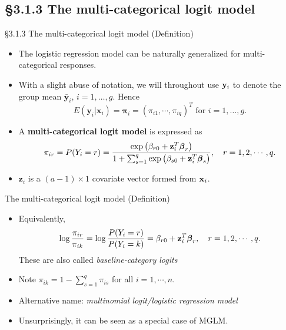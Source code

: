 \documentclass{beamer}
\newcommand{\boldpi}{{\boldsymbol \pi}}
\newcommand{\currentsubsection}{}
\let\oldsubsection\subsection
\renewcommand{\subsection}[1]{\oldsubsection{#1}\renewcommand{\currentsubsection}{#1}}
\newenvironment{wideitemize}%
  {\begin{itemize}%
    \setlength{\parskip}{1em}}%
  {\end{itemize}}
\begin{document}
\subsection{\S3.1.3 The multi-categorical logit model}\label{sec:3.1.3}
\begin{frame}{\S3.1.3 The multi-categorical logit model (Definition) }
\begin{wideitemize}
\item The logistic regression model can be naturally generalized for multi-categorical responses.

\item  With a slight abuse of notation,  we will throughout use 
${\bf y}_i$ to denote the group mean $\bar{\textbf{y}}_i$, $i = 1, \dots, g$. Hence
\[
E(\textbf{y}_i|\textbf{x}_i) = \boldpi_i = (\pi_{i1},\cdots, \pi_{iq})^T \text{ for } i =1, \dots, g
.
\]


\item A \textbf{multi-categorical logit model} is expressed as
\[
\pi_{ir}=P(Y_i=r)=\frac{\exp\left(\beta_{r0}+\textbf{z}_i^T\mbox{\boldmath $\beta$}_r\right)}{1+
\sum_{s=1}^q \exp\left(\beta_{s0}+\textbf{z}_i^T\mbox{\boldmath $\beta$}_s\right)}, \quad r=1,2,\cdots, q.
\]

\item  $\textbf{z}_i$ is a $(a-1) \times 1$ covariate vector formed from ${\bf x}_i$.




\end{wideitemize}
\end{frame}

\begin{frame}{ The multi-categorical logit model (Definition) }


\begin{wideitemize}

\item Equivalently,
$$\log\frac{\pi_{ir}}{\pi_{ik}}=\log\frac{P(Y_i=r)}{P(Y_i=k)}=\beta_{r0}+\textbf{z}_i^T\mbox{\boldmath $\beta$}_r,
\quad r=1,2,\cdots, q.$$
These are also called \emph{baseline-category logits} \cite[Ch. 8]{Agresti2013}

\item Note $\pi_{ik}=1-\sum_{s=1}^q\pi_{is}$ for all $i=1,\cdots,n$. 
\item  Alternative name: \emph{multinomial logit/logistic regression model}

\item Unsurprisingly, it  can be  seen as 
 a special case of MGLM.
\end{wideitemize}
\end{frame}
\end{document}
